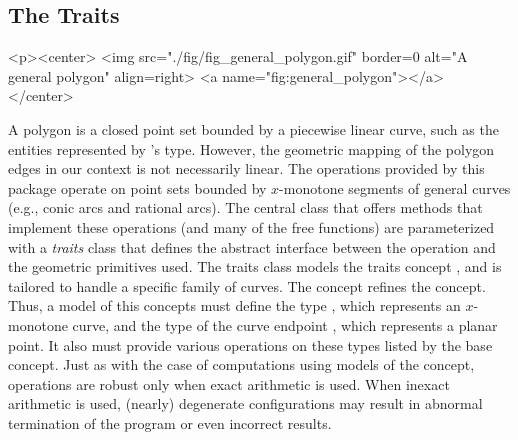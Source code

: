 \subsection{The Traits}
\label{bso_ssec:traits}
\lcHtml{\label{fig:general_polygon}}
\begin{ccHtmlOnly}
  <p><center>
    <img src="./fig/fig_general_polygon.gif" border=0 alt="A general polygon" align=right>
  <a name="fig:general_polygon"></a>
  </center>
\end{ccHtmlOnly}
A polygon is a closed point set bounded by a piecewise linear curve, such
as the entities represented by \cgal 's  type. However,
the geometric mapping of the polygon edges in our context is not
necessarily linear. The operations provided by this package operate on
point sets bounded by $x$-monotone segments of general curves (e.g.,
conic arcs and rational arcs). The central class 
that offers methods that implement these operations (and many of the free
functions) are parameterized with a {\em traits} class that defines
the abstract interface between the operation and the geometric
primitives used. The traits class models the traits concept
, and is tailored to handle a specific
family of curves. The concept  refines
the  concept. Thus, a model of this
concepts must define the type , which
represents an $x$-monotone curve, and the type of the curve endpoint 
, which represents a planar point. It also must provide
various operations on these types listed by the base concept.
Just as with the case of computations using models of the 
 concept, operations are robust only
when exact arithmetic is used. When inexact arithmetic is used,
(nearly) degenerate configurations may result in abnormal termination
of the program or even incorrect results.

